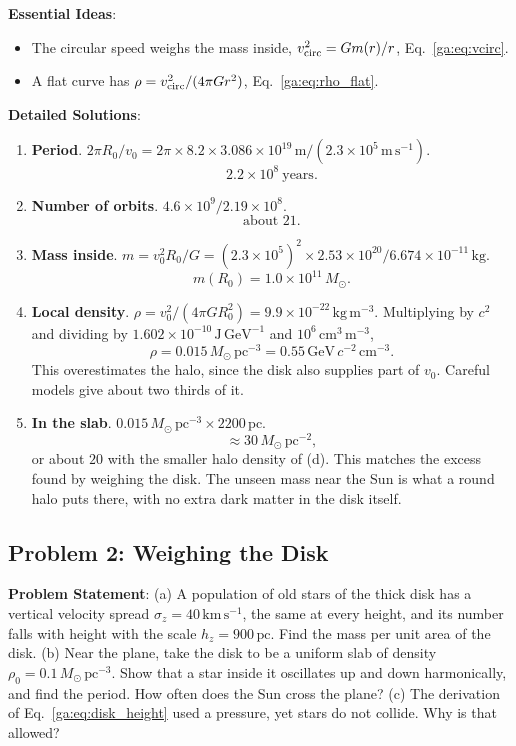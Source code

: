 \textbf{Essential Ideas}:
\begin{itemize}
	\item The circular speed weighs the mass inside, $v_{\rm circ}^2=Gm(r)/r$, Eq.~\eqref{ga:eq:vcirc}.
	\item A flat curve has $\rho=v_{\rm circ}^2/(4\pi Gr^2)$, Eq.~\eqref{ga:eq:rho_flat}.
\end{itemize}

\textbf{Detailed Solutions}:
\begin{enumerate}[label=(\alph*)]
	\item \textbf{Period}. $2\pi R_0/v_0=2\pi\times8.2\times3.086\times10^{19}\,\mathrm m/(2.3\times10^5\,\mathrm{m\,s^{-1}})$.
	\[
	\boxed{2.2\times10^8\ \text{years}.}
	\]
	\item \textbf{Number of orbits}. $4.6\times10^9/2.19\times10^8$.
	\[
	\boxed{\text{about }21.}
	\]
	\item \textbf{Mass inside}. $m=v_0^2R_0/G=(2.3\times10^5)^2\times2.53\times10^{20}/6.674\times10^{-11}\,\mathrm{kg}$.
	\[
	\boxed{m(R_0)=1.0\times10^{11}\,M_\odot.}
	\]
	\item \textbf{Local density}. $\rho=v_0^2/(4\pi GR_0^2)=9.9\times10^{-22}\,\mathrm{kg\,m^{-3}}$. Multiplying by $c^2$ and dividing by $1.602\times10^{-10}\,\mathrm{J\,GeV^{-1}}$ and $10^6\,\mathrm{cm^3\,m^{-3}}$,
	\[
	\boxed{\rho=0.015\,M_\odot\,\mathrm{pc^{-3}}=0.55\,\mathrm{GeV}\,c^{-2}\,\mathrm{cm^{-3}}.}
	\]
	This overestimates the halo, since the disk also supplies part of $v_0$. Careful models give about two thirds of it.
	\item \textbf{In the slab}. $0.015\,M_\odot\,\mathrm{pc^{-3}}\times2200\,\mathrm{pc}$.
	\[
	\boxed{\approx30\,M_\odot\,\mathrm{pc^{-2}},}
	\]
	or about $20$ with the smaller halo density of (d). This matches the excess found by weighing the disk. The unseen mass near the Sun is what a round halo puts there, with no extra dark matter in the disk itself.
\end{enumerate}

\subsection{Problem 2: Weighing the Disk}
\label{ga:prob:disk}

\textbf{Problem Statement}: (a) A population of old stars of the thick disk has a vertical velocity spread $\sigma_z=40\,\mathrm{km\,s^{-1}}$, the same at every height, and its number falls with height with the scale $h_z=900\,\mathrm{pc}$. Find the mass per unit area of the disk. (b) Near the plane, take the disk to be a uniform slab of density $\rho_0=0.1\,M_\odot\,\mathrm{pc^{-3}}$. Show that a star inside it oscillates up and down harmonically, and find the period. How often does the Sun cross the plane? (c) The derivation of Eq.~\eqref{ga:eq:disk_height} used a pressure, yet stars do not collide. Why is that allowed?

